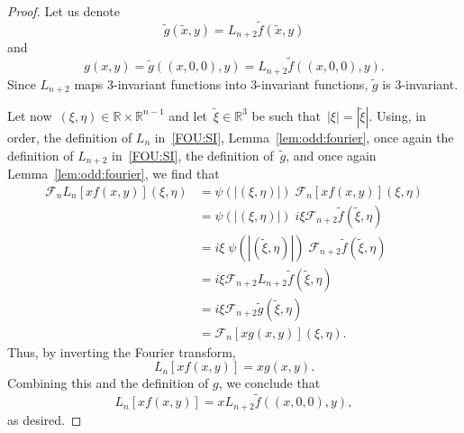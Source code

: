 \documentclass[10pt,a4paper]{amsart}
\newcommand{\R}{\mathds{R}}
\newcommand{\fourier}{\mathscr{F}}
\begin{document}
\begin{proof}
Let us denote
\[
 \tilde{g}(\tilde{x}, y) = L_{n + 2} \tilde{f}(\tilde{x}, y)
\]
and
\[
 g(x, y) = \tilde{g}((x, 0, 0), y) = L_{n +2} \tilde{f}((x, 0, 0), y) .
\]
Since $L_{n + 2}$ maps $3$-invariant functions into $3$-invariant functions, $\tilde{g}$ is $3$-invariant.


Let now~$(\xi,\eta)\in\R\times\R^{n-1}$ and let~$\tilde\xi\in\R^3$ be such that~$|\xi| = |\tilde{\xi}|$. Using, in order, the definition of $L_n$
in~\eqref{FOU:SI}, Lemma~\ref{lem:odd:fourier}, once again the definition of $L_{n + 2}$ in~\eqref{FOU:SI}, the definition of~$\tilde{g}$, and once again Lemma~\ref{lem:odd:fourier}, we find that
\begin{align*}
 \fourier_n L_n[x f(x, y)](\xi, \eta) & = \psi(|(\xi, \eta)|)\;\fourier_n[x f(x, y)](\xi, \eta) \\
 & = \psi(|(\xi, \eta)|) \; i \xi \fourier_{n + 2} \tilde{f}(\tilde{\xi}, \eta) \\
 & = i \xi \; \psi(|(\tilde \xi, \eta)|) \; \fourier_{n + 2} \tilde{f}(\tilde{\xi}, \eta) \\
 & = i \xi \fourier_{n + 2} L_{n + 2} \tilde{f}(\tilde{\xi}, \eta) \\
 & = i \xi \fourier_{n + 2} \tilde{g}(\tilde{\xi}, \eta) \\
 & = \fourier_n[x g(x, y)](\xi, \eta) .
\end{align*}
Thus, by inverting the Fourier transform,
\[ L_n[x f(x, y)]=x g(x, y). \]
Combining this and the definition of $g$, we conclude that
\begin{equation*}
L_n[x f(x, y)]  %
=x L_{n + 2} \tilde{f}((x, 0, 0), y),
\end{equation*}
as desired.
\end{proof}
\end{document}
